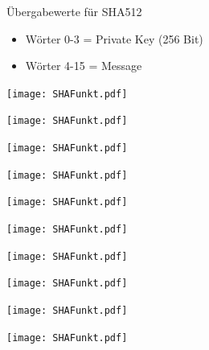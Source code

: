 \documentclass[
  10pt,
  ignorenonframetext,
  aspectratio=43,
]{beamer}
\begin{document}
\begin{frame}{Übergabewerte für SHA512}
\protect\hypertarget{uxfcbergabewerte-fuxfcr-sha512}{}
\begin{itemize}
\item
  Wörter 0-3 = Private Key (256 Bit)
\item
  Wörter 4-15 = Message
\end{itemize}
\end{frame}

\begin{frame}{}
\protect\hypertarget{section-4}{}
\texttt{[image: SHAFunkt.pdf]}
\end{frame}

\begin{frame}{}
\protect\hypertarget{section-5}{}
\texttt{[image: SHAFunkt.pdf]}
\end{frame}

\begin{frame}{}
\protect\hypertarget{section-6}{}
\texttt{[image: SHAFunkt.pdf]}
\end{frame}

\begin{frame}{}
\protect\hypertarget{section-7}{}
\texttt{[image: SHAFunkt.pdf]}
\end{frame}

\begin{frame}{}
\protect\hypertarget{section-8}{}
\texttt{[image: SHAFunkt.pdf]}
\end{frame}

\begin{frame}{}
\protect\hypertarget{section-9}{}
\texttt{[image: SHAFunkt.pdf]}
\end{frame}

\begin{frame}{}
\protect\hypertarget{section-10}{}
\texttt{[image: SHAFunkt.pdf]}
\end{frame}

\begin{frame}{}
\protect\hypertarget{section-11}{}
\texttt{[image: SHAFunkt.pdf]}
\end{frame}

\begin{frame}{}
\protect\hypertarget{section-12}{}
\texttt{[image: SHAFunkt.pdf]}
\end{frame}

\begin{frame}{}
\protect\hypertarget{section-13}{}
\texttt{[image: SHAFunkt.pdf]}
\end{frame}
\end{document}
